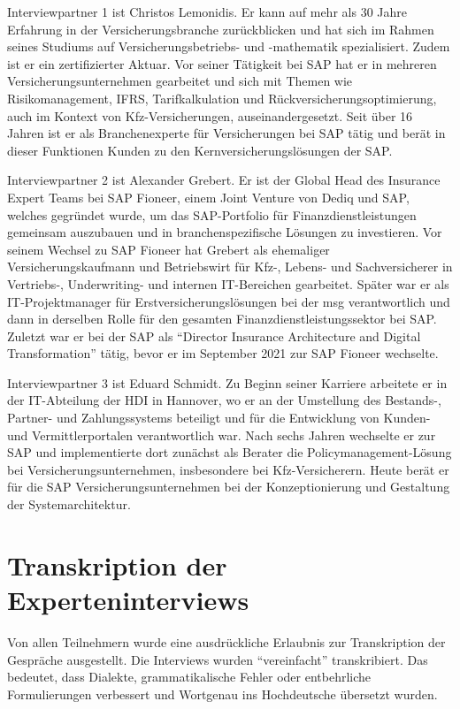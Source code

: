 Interviewpartner 1 ist Christos Lemonidis. Er kann auf mehr als 30 Jahre Erfahrung in der Versicherungsbranche zurückblicken und hat sich im Rahmen seines Studiums auf Versicherungsbetriebs- und -mathematik spezialisiert. Zudem ist er ein zertifizierter Aktuar. Vor seiner Tätigkeit bei SAP hat er in mehreren Versicherungsunternehmen gearbeitet und sich mit Themen wie Risikomanagement, IFRS, Tarifkalkulation und Rückversicherungsoptimierung, auch im Kontext von Kfz-Versicherungen, auseinandergesetzt. Seit über 16 Jahren ist er als Branchenexperte für Versicherungen bei SAP tätig und berät in dieser Funktionen Kunden zu den Kernversicherungslösungen der SAP.  

Interviewpartner 2 ist Alexander Grebert. Er ist der Global Head des Insurance Expert Teams bei SAP Fioneer, einem Joint Venture von Dediq und SAP, welches gegründet wurde, um das SAP-Portfolio für Finanzdienstleistungen gemeinsam auszubauen und in branchenspezifische Lösungen zu investieren. Vor seinem Wechsel zu SAP Fioneer hat Grebert als ehemaliger Versicherungskaufmann und Betriebswirt für Kfz-, Lebens- und Sachversicherer in Vertriebs-, Underwriting- und internen IT-Bereichen gearbeitet. Später war er als IT-Projektmanager für Erstversicherungslösungen bei der msg verantwortlich und dann in derselben Rolle für den gesamten Finanzdienstleistungssektor bei SAP. Zuletzt war er bei der SAP als \enquote{Director Insurance Architecture and Digital Transformation} tätig, bevor er im September 2021 zur SAP Fioneer wechselte.

Interviewpartner 3 ist Eduard Schmidt. Zu Beginn seiner Karriere arbeitete er in der IT-Abteilung der HDI in Hannover, wo er an der Umstellung des Bestands-, Partner- und Zahlungssystems beteiligt und für die Entwicklung von Kunden- und Vermittlerportalen verantwortlich war. Nach sechs Jahren wechselte er zur SAP und implementierte dort zunächst als Berater die Policymanagement-Lösung bei Versicherungsunternehmen, insbesondere bei Kfz-Versicherern. Heute berät er für die SAP Versicherungsunternehmen bei der Konzeptionierung und Gestaltung der Systemarchitektur.

\section{Transkription der Experteninterviews}

Von allen Teilnehmern wurde eine ausdrückliche Erlaubnis zur Transkription der Gespräche ausgestellt. Die Interviews wurden \enquote{vereinfacht} transkribiert. Das bedeutet, dass Dialekte, grammatikalische Fehler oder entbehrliche Formulierungen verbessert und Wortgenau ins Hochdeutsche übersetzt wurden.\autocite[Vgl.][S. 292]{TAUSENDPFUND2020}

